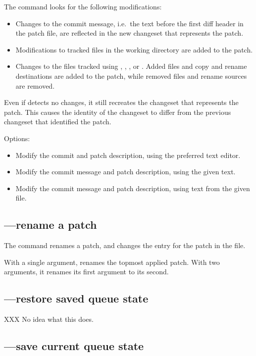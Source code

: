 The  command looks for the following modifications:
\begin{itemize}
\item Changes to the commit message, i.e.~the text before the first
  diff header in the patch file, are reflected in the new changeset
  that represents the patch.
\item Modifications to tracked files in the working directory are
  added to the patch.
\item Changes to the files tracked using , ,
  , or .  Added files and copy and rename
  destinations are added to the patch, while removed files and rename
  sources are removed.
\end{itemize}

Even if  detects no changes, it still recreates the
changeset that represents the patch.  This causes the identity of the
changeset to differ from the previous changeset that identified the
patch.

Options:
\begin{itemize}
\item[\hgopt{qrefresh}{-e}] Modify the commit and patch description,
  using the preferred text editor.
\item[\hgopt{qrefresh}{-m}] Modify the commit message and patch
  description, using the given text.
\item[\hgopt{qrefresh}{-l}] Modify the commit message and patch
  description, using text from the given file.
\end{itemize}

\subsection{---rename a patch}

The  command renames a patch, and changes the entry for
the patch in the  file.

With a single argument,  renames the topmost applied
patch.  With two arguments, it renames its first argument to its
second.

\subsection{---restore saved queue state}

XXX No idea what this does.

\subsection{---save current queue state}

